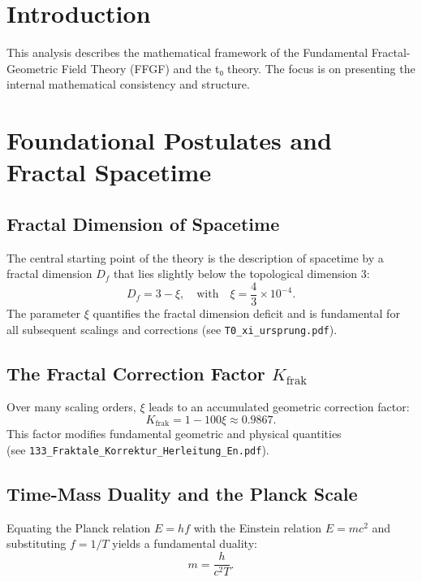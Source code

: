\section{Introduction}
	This analysis describes the mathematical framework of the Fundamental Fractal-Geometric Field Theory (FFGF) and the t₀ theory. The focus is on presenting the internal mathematical consistency and structure.
	
	\section{Foundational Postulates and Fractal Spacetime}
	\subsection{Fractal Dimension of Spacetime}
	The central starting point of the theory is the description of spacetime by a fractal dimension \(D_f\) that lies slightly below the topological dimension 3:
	\begin{equation}
		D_f = 3 - \xi, \quad \text{with} \quad \xi = \frac{4}{3} \times 10^{-4}.
		\label{eq:fractal_dimension}
	\end{equation}
	The parameter \(\xi\) quantifies the fractal dimension deficit and is fundamental for all subsequent scalings and corrections
	(see \texttt{T0\_xi\_ursprung.pdf}).
	
	\subsection{The Fractal Correction Factor \(K_{\text{frak}}\)}
	Over many scaling orders, \(\xi\) leads to an accumulated geometric correction factor:
	\begin{equation}
		K_{\text{frak}} = 1 - 100\xi \approx 0.9867.
		\label{eq:K_frak}
	\end{equation}
	This factor modifies fundamental geometric and physical quantities \\
	(see \texttt{133\_Fraktale\_Korrektur\_Herleitung\_En.pdf}).
	
	\subsection{Time-Mass Duality and the Planck Scale}
	Equating the Planck relation \(E = hf\) with the Einstein relation \(E = mc^2\) and substituting \(f = 1/T\) yields a fundamental duality:
	\begin{equation}
		m = \frac{h}{c^2 T}.
		\label{eq:time_mass_duality}
	\end{equation}

